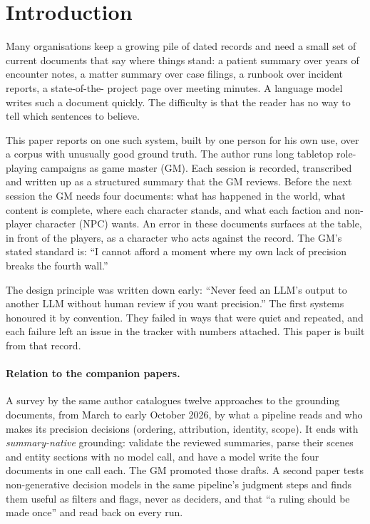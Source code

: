 \documentclass[11pt]{article}
\begin{document}
\section{Introduction}

Many organisations keep a growing pile of dated records and need a small set of current
documents that say where things stand: a patient summary over years of encounter notes,
a matter summary over case filings, a runbook over incident reports, a state-of-the-
project page over meeting minutes. A language model writes such a document quickly. The
difficulty is that the reader has no way to tell which sentences to believe.

This paper reports on one such system, built by one person for his own use, over a
corpus with unusually good ground truth. The author runs long tabletop role-playing
campaigns as game master (GM). Each session is recorded, transcribed and written up as a
structured summary that the GM reviews. Before the next session the GM needs four
documents: what has happened in the world, what content is complete, where each
character stands, and what each faction and non-player character (NPC) wants. An error
in these documents surfaces at the table, in front of the players, as a character who
acts against the record. The GM's stated standard is: ``I cannot afford a moment where
my own lack of precision breaks the fourth wall.''

The design principle was written down early: ``Never feed an LLM's output to another
LLM without human review if you want precision.'' The first systems honoured it by
convention. They failed in ways that were quiet and repeated, and each failure left an
issue in the tracker with numbers attached. This paper is built from that record.

\paragraph{Relation to the companion papers.} A survey by the same author
\citep{roussos2026survey} catalogues twelve approaches to the grounding documents,
from March to early October 2026, by what a pipeline reads and who makes its precision
decisions (ordering, attribution, identity, scope). It ends with \emph{summary-native}
grounding: validate the reviewed summaries, parse their scenes and entity sections with
no model call, and have a model write the four documents in one call each. The GM
promoted those drafts. A second paper \citep{roussos2026decision} tests non-generative
decision models in the same pipeline's judgment steps and finds them useful as filters
and flags, never as deciders, and that ``a ruling should be made once'' and read back on
every run.
\end{document}
